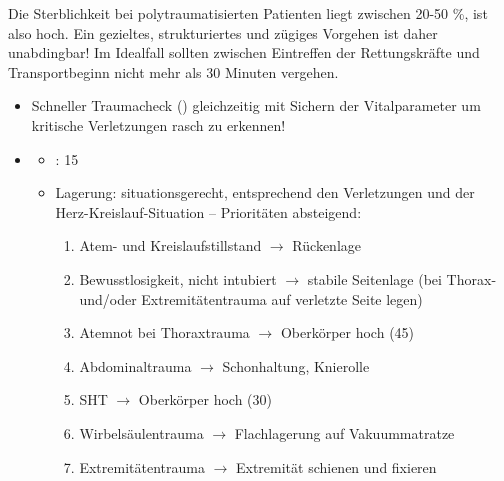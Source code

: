 
Die Sterblichkeit bei polytraumatisierten Patienten liegt zwischen 20-50 \%, ist
also hoch. Ein gezieltes, strukturiertes und zügiges Vorgehen ist daher
unabdingbar! Im Idealfall sollten zwischen Eintreffen der Rettungskräfte und
Transportbeginn nicht mehr als 30 Minuten vergehen. \cite{BoehmerTaschRett6}

{    
\begin{itemize}
  \item Schneller Traumacheck () gleichzeitig
  mit Sichern der Vitalparameter um kritische Verletzungen rasch zu
  erkennen!
  \item \TxMassVitBes
  \begin{itemize}
    \item {}: 15\LMin
    \item Lagerung: situationsgerecht, entsprechend den Verletzungen
    und der Herz-Kreislauf-Situation -- Prioritäten absteigend:
    {
    \scriptsize
    \begin{enumerate}
      \item Atem- und Kreislaufstillstand $\rightarrow$ Rückenlage
      \item Bewusstlosigkeit, nicht intubiert $\rightarrow$ stabile Seitenlage 
      (bei Thorax- und/oder Extremitätentrauma auf verletzte Seite legen)
      \item Atemnot bei Thoraxtrauma $\rightarrow$ Oberkörper hoch (45\textdegree)
      \item Abdominaltrauma $\rightarrow$ Schonhaltung, Knierolle
      \item SHT $\rightarrow$ Oberkörper hoch (30\textdegree)
      \item Wirbelsäulentrauma $\rightarrow$ Flachlagerung auf Vakuummatratze
      \item Extremitätentrauma $\rightarrow$ Extremität schienen und fixieren

\end{enumerate}}
\end{itemize}
\end{itemize}}
